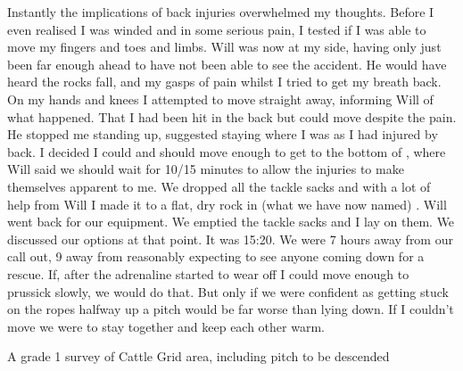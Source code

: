     Instantly the implications of back injuries overwhelmed my thoughts. Before I even realised I was winded and in some serious pain, I tested if I was able to move my fingers and toes and limbs. Will was now at my side, having only just been far enough ahead to have not been able to see the accident. He would have heard the rocks fall, and my gasps of pain whilst I tried to get my breath back. On my hands and knees I attempted to move straight away, informing Will of what happened. That I had been hit in the back but could move despite the pain. He stopped me standing up, suggested staying where I was as I had injured by back. I decided I could and should move enough to get to the bottom of , where Will said we should wait for 10/15 minutes to allow the injuries to make themselves apparent to me. We dropped all the tackle sacks and with a lot of help from Will I made it to a flat, dry rock in (what we have now named) . Will went back for our equipment. We emptied the tackle sacks and I lay on them. We discussed our options at that point. It was 15:20. We were 7 hours away from our call out, 9 away from reasonably expecting to see anyone coming down for a rescue. If, after the adrenaline started to wear off I could move enough to prussick slowly, we would do that. But only if we were confident as getting stuck on the ropes halfway up a pitch would be far worse than lying down. If I couldn't move we were to stay together and keep each other warm.

    \begin{survey}[t]
        \checkoddpage \ifoddpage \forcerectofloat \else \forceversofloat \fi
        \centering
        \caption[Cattle Grid (grade 1)]{A grade 1 survey of Cattle Grid area, including pitch to be descended }
        \label{Cattlegrid}
    \end{survey}

